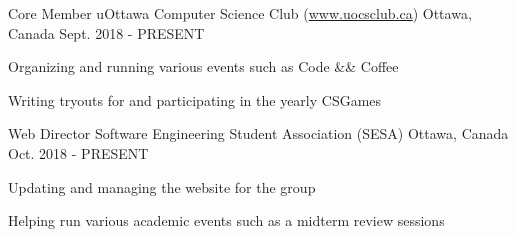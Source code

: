 

\begin{cventries}

  \cventry
    {Core Member} %
    {uOttawa Computer Science Club (\url{www.uocsclub.ca})} %
    {Ottawa, Canada} %
    {Sept. 2018 - PRESENT} %
    {
      \begin{cvitems} %
        \item {Organizing and running various events such as Code \&\& Coffee}
        \item {Writing tryouts for and participating in the yearly CSGames}
      \end{cvitems}
    }

  \cventry
    {Web Director} %
    {Software Engineering Student Association (SESA)} %
    {Ottawa, Canada} %
    {Oct. 2018 - PRESENT} %
    {
      \begin{cvitems} %
        \item {Updating and managing the website for the group}
        \item {Helping run various academic events such as a midterm review sessions}
      \end{cvitems}
    }

\end{cventries}
